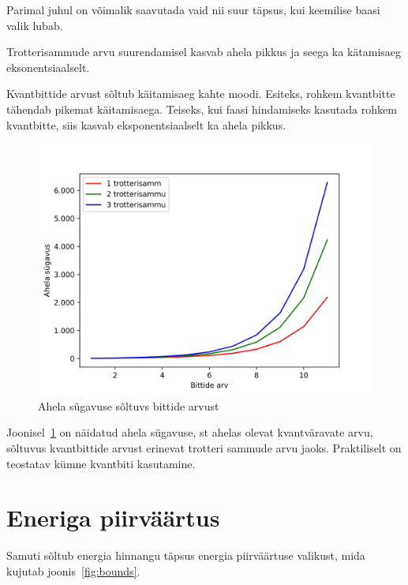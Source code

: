 \documentclass[12pt]{report}
\begin{document}
Parimal juhul on võimalik saavutada vaid nii suur täpsus, kui keemilise baasi valik lubab.

Trotterisammude arvu suurendamisel kasvab ahela pikkus ja seega ka kätamisaeg eksonentsiaalselt.

Kvantbittide arvust sõltub käitamisaeg kahte moodi.
Esiteks, rohkem kvantbitte tähendab pikemat käitamisaega.
Teiseks, kui faasi hindamiseks kasutada rohkem kvantbitte, siis kasvab eksponentsiaalselt ka ahela pikkus.

\begin{figure}[h]
    \centering
    \includegraphics{depths.jpg}
    \caption{Ahela sügavuse sõltuvs bittide arvust}
    \label{fig:depths}
\end{figure}

Joonisel~\ref{fig:depths} on näidatud ahela sügavuse, st ahelas olevat kvantväravate arvu, sõltuvus kvantbittide arvust erinevat trotteri sammude arvu jaoks.
Praktiliselt on teostatav kümne kvantbiti kasutamine.


\section{Eneriga piirväärtus}

Samuti sõltub energia hinnangu täpsus energia piirväärtuse valikust, mida kujutab joonis~\ref{fig:bounds}.
\end{document}
